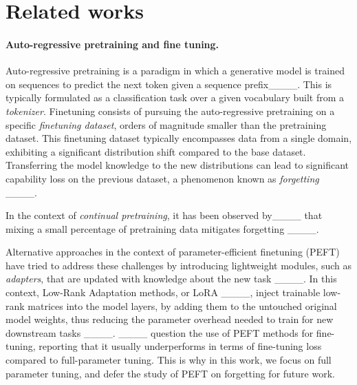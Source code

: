 \section{Related works}
\paragraph{Auto-regressive pretraining and fine tuning.} Auto-regressive pretraining is a paradigm in which a generative model is trained on sequences to predict the next token given a sequence prefix____. This is typically formulated as a classification task over a given vocabulary built from a \textit{tokenizer}. 
Finetuning consists of pursuing the auto-regressive pretraining on a specific \textit{finetuning dataset}, orders of magnitude smaller than the pretraining dataset. 
This finetuning dataset typically encompasses data from a single domain, exhibiting a significant distribution shift compared to the base dataset. 
Transferring the model knowledge to the new distributions can lead to significant capability loss on the previous dataset, a phenomenon known as \textit{forgetting} ____.

In the context of \textit{continual pretraining}, it has been observed by____ that mixing a small percentage of pretraining data mitigates forgetting ____.




Alternative approaches in the context of parameter-efficient finetuning (PEFT) have tried to address these challenges by introducing lightweight modules, such as \textit{adapters}, that are updated with knowledge about the new task ____. 
In this context, Low-Rank Adaptation methods, or LoRA ____, inject trainable low-rank matrices into the model layers, by adding them to the untouched original model weights, thus reducing the parameter overhead needed to train for new downstream tasks ____.
____ question the use of PEFT methods for fine-tuning, reporting that it usually underperforms in terms of fine-tuning loss compared to full-parameter tuning. 
This is why in this work, we focus on full parameter tuning, and defer the study of PEFT on forgetting for future work. 

